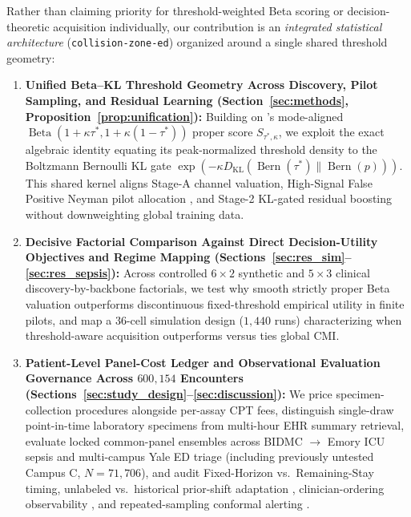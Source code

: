 \documentclass[11pt]{article}
\begin{document}
Rather than claiming priority for threshold-weighted Beta scoring or decision-theoretic acquisition individually, our contribution is an \emph{integrated statistical architecture} (\texttt{collision-zone-ed}) organized around a single shared threshold geometry:
\begin{enumerate}
  \item \textbf{Unified Beta--KL Threshold Geometry Across Discovery, Pilot Sampling, and Residual Learning (Section~\ref{sec:methods}, Proposition~\ref{prop:unification}):} Building on \citet{buja2005loss}'s mode-aligned $\operatorname{Beta}(1+\kappa\tau^*, 1+\kappa(1-\tau^*))$ proper score $S_{\tau^*,\kappa}$, we exploit the exact algebraic identity equating its peak-normalized threshold density to the Boltzmann Bernoulli KL gate $\exp(-\kappa D_{\text{KL}}(\operatorname{Bern}(\tau^*)\|\operatorname{Bern}(p)))$. This shared kernel aligns Stage-A channel valuation, High-Signal False Positive Neyman pilot allocation \citep{horvitz1952generalization,lumley2010complex,tao2020optimal}, and Stage-2 KL-gated residual boosting without downweighting global training data.
  \item \textbf{Decisive Factorial Comparison Against Direct Decision-Utility Objectives and Regime Mapping (Sections~\ref{sec:res_sim}--\ref{sec:res_sepsis}):} Across controlled $6\times 2$ synthetic and $5\times 3$ clinical discovery-by-backbone factorials, we test why smooth strictly proper Beta valuation outperforms discontinuous fixed-threshold empirical utility in finite pilots, and map a $36$-cell simulation design ($1{,}440$ runs) characterizing when threshold-aware acquisition outperforms versus ties global CMI.
  \item \textbf{Patient-Level Panel-Cost Ledger and Observational Evaluation Governance Across $600{,}154$ Encounters (Sections~\ref{sec:study_design}--\ref{sec:discussion}):} We price specimen-collection procedures alongside per-assay CPT fees, distinguish single-draw point-in-time laboratory specimens from multi-hour EHR summary retrieval, evaluate locked common-panel ensembles across BIDMC $\to$ Emory ICU sepsis and multi-campus Yale ED triage (including previously untested Campus C, $N=71{,}706$), and audit Fixed-Horizon vs.\ Remaining-Stay timing, unlabeled vs.\ historical prior-shift adaptation \citep{saerens2002adjusting}, clinician-ordering observability \citep{agniel2018biases,vonkleist2025evaluation}, and repeated-sampling conformal alerting \citep{jin2023selection}.
\end{enumerate}
\end{document}
